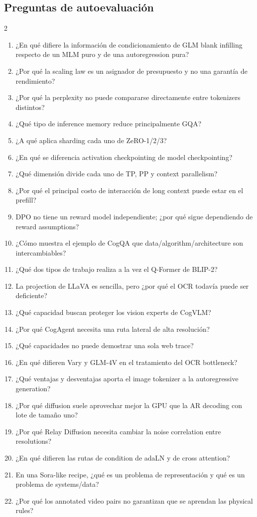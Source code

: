 \documentclass[a4paper]{article}
\begin{document}
\subsection{Preguntas de autoevaluación}

\begin{multicols}{2}
\footnotesize
\begin{enumerate}
  \setlength{\itemsep}{0pt}
  \setlength{\parskip}{0pt}
  \item ¿En qué difiere la información de condicionamiento de GLM blank infilling respecto de un MLM puro y de una autoregression pura?
  \item ¿Por qué la scaling law es un asignador de presupuesto y no una garantía de rendimiento?
  \item ¿Por qué la perplexity no puede compararse directamente entre tokenizers distintos?
  \item ¿Qué tipo de inference memory reduce principalmente GQA?
  \item ¿A qué aplica sharding cada uno de ZeRO-1/2/3?
  \item ¿En qué se diferencia activation checkpointing de model checkpointing?
  \item ¿Qué dimensión divide cada uno de TP, PP y context parallelism?
  \item ¿Por qué el principal costo de interacción de long context puede estar en el prefill?
  \item DPO no tiene un reward model independiente; ¿por qué sigue dependiendo de reward assumptions?
  \item ¿Cómo muestra el ejemplo de CogQA que data/algorithm/architecture son intercambiables?
  \item ¿Qué dos tipos de trabajo realiza a la vez el Q-Former de BLIP-2?
  \item La projection de LLaVA es sencilla, pero ¿por qué el OCR todavía puede ser deficiente?
  \item ¿Qué capacidad buscan proteger los vision experts de CogVLM?
  \item ¿Por qué CogAgent necesita una ruta lateral de alta resolución?
  \item ¿Qué capacidades no puede demostrar una sola web trace?
  \item ¿En qué difieren Vary y GLM-4V en el tratamiento del OCR bottleneck?
  \item ¿Qué ventajas y desventajas aporta el image tokenizer a la autoregressive generation?
  \item ¿Por qué diffusion suele aprovechar mejor la GPU que la AR decoding con lote de tamaño uno?
  \item ¿Por qué Relay Diffusion necesita cambiar la noise correlation entre resolutions?
  \item ¿En qué difieren las rutas de condition de adaLN y de cross attention?
  \item En una Sora-like recipe, ¿qué es un problema de representación y qué es un problema de systems/data?
  \item ¿Por qué los annotated video pairs no garantizan que se aprendan las physical rules?
\end{enumerate}
\end{multicols}
\end{document}
